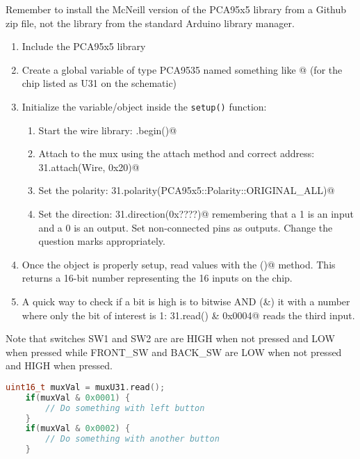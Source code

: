 Remember to install the McNeill version of the PCA95x5 library from a Github zip 
file, not the library from the standard Arduino library manager.

\begin{enumerate}
    \item Include the PCA95x5 library
    \item Create a global variable of type PCA9535 named something like @ 
            (for the chip listed as U31 on the schematic)
    \item Initialize the variable/object inside the \lstinline|setup()| function:
    \begin{enumerate}
        \item Start the wire library: \lstinline@Wire.begin()@
        \item Attach to the mux using the attach method and correct address: 
                \lstinline@muxU31.attach(Wire, 0x20)@
        \item Set the polarity: \lstinline@muxU31.polarity(PCA95x5::Polarity::ORIGINAL_ALL)@ 
        \item Set the direction: \lstinline@muxU31.direction(0x????)@ remembering that a 1 is 
                an input and a 0 is an output. Set non-connected pins as outputs. Change the 
                question marks appropriately.
    \end{enumerate}
    \item Once the object is properly setup, read values with the \lstinline@read()@ 
            method. This returns a 16-bit number representing the 16 inputs on the chip.
    \item A quick way to check if a bit is high is to bitwise AND (\&) it with a number 
            where only the bit of interest is 1: \lstinline@mux31.read() & 0x0004@ reads 
            the third input.
\end{enumerate}

Note that switches SW1 and SW2 are are HIGH when not pressed and LOW 
when pressed while FRONT\_SW and BACK\_SW are LOW when not pressed and HIGH when pressed.

\begin{lstlisting}[language=C++, caption={The buttons attached to the PCA9535 can be accessed 
    as shown in this code snippet.},label={lst:muxButtons}]
    uint16_t muxVal = muxU31.read();
    if(muxVal & 0x0001) {
        // Do something with left button
    }
    if(muxVal & 0x0002) {
        // Do something with another button
    }
\end{lstlisting}



